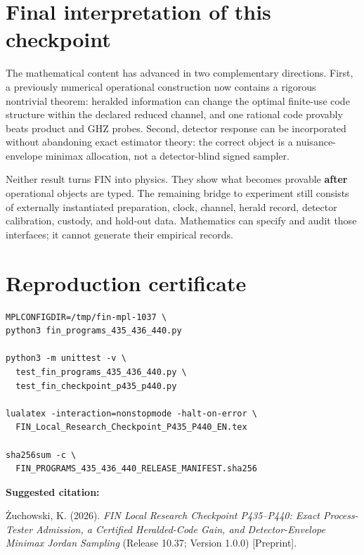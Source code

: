 \documentclass[11pt,a4paper,openany]{report}
\begin{document}
\chapter{Final interpretation of this checkpoint}

The mathematical content has advanced in two complementary directions. First, a previously numerical operational construction now contains a rigorous nontrivial theorem: heralded information can change the optimal finite-use code structure within the declared reduced channel, and one rational code provably beats product and GHZ probes. Second, detector response can be incorporated without abandoning exact estimator theory: the correct object is a nuisance-envelope minimax allocation, not a detector-blind signed sampler.

Neither result turns FIN into physics. They show what becomes provable \textbf{after} operational objects are typed. The remaining bridge to experiment still consists of externally instantiated preparation, clock, channel, herald record, detector calibration, custody, and hold-out data. Mathematics can specify and audit those interfaces; it cannot generate their empirical records.


\clearpage
\chapter*{Reproduction certificate}
\begin{Verbatim}[fontsize=\small]
MPLCONFIGDIR=/tmp/fin-mpl-1037 \
python3 fin_programs_435_436_440.py

python3 -m unittest -v \
  test_fin_programs_435_436_440.py \
  test_fin_checkpoint_p435_p440.py

lualatex -interaction=nonstopmode -halt-on-error \
  FIN_Local_Research_Checkpoint_P435_P440_EN.tex

sha256sum -c \
  FIN_PROGRAMS_435_436_440_RELEASE_MANIFEST.sha256
\end{Verbatim}

\noindent\textbf{Suggested citation:}

\.Zuchowski, K. (2026). \emph{FIN Local Research Checkpoint P435--P440:
Exact Process-Tester Admission, a Certified Heralded-Code Gain, and
Detector-Envelope Minimax Jordan Sampling} (Release 10.37; Version 1.0.0)
[Preprint].
\end{document}
